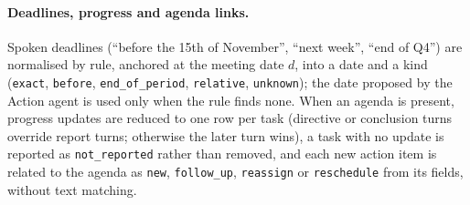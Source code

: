 \paragraph{Deadlines, progress and agenda links.}
Spoken deadlines (``before the 15th of November'', ``next week'', ``end of Q4'') are normalised by rule, anchored at the meeting date $d$, into a date and a kind (\texttt{exact}, \texttt{before}, \texttt{end\_of\_period}, \texttt{relative}, \texttt{unknown}); the date proposed by the Action agent is used only when the rule finds none.
When an agenda is present, progress updates are reduced to one row per task (directive or conclusion turns override report turns; otherwise the later turn wins), a task with no update is reported as \texttt{not\_reported} rather than removed, and each new action item is related to the agenda as \texttt{new}, \texttt{follow\_up}, \texttt{reassign} or \texttt{reschedule} from its fields, without text matching.
